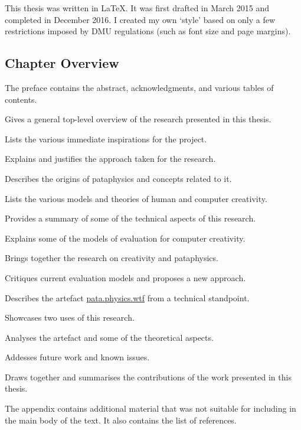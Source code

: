 This thesis was written in \LaTeX. It was first drafted in March 2015 and completed in December 2016. I created my own `style' based on only a few restrictions imposed by \ac{DMU} regulations (such as font size and page margins).


\subsection{Chapter Overview}

The preface contains the abstract, acknowledgments, and various tables of contents.

\begin{description}[leftmargin=3.5cm]
  \item[Introduction] Gives a general top-level overview of the research presented in this thesis.
  \item[Inspirations] Lists the various immediate inspirations for the project.
  \item[Methodology] Explains and justifies the approach taken for the research.
  \item[Pataphysics] Describes the origins of pataphysics and concepts related to it. 
  \item[Creativity] Lists the various models and theories of human and computer creativity.
  \item[Technology] Provides a summary of some of the technical aspects of this research.
  \item[Evaluation] Explains some of the models of evaluation for computer creativity.
  \item[Foundations] Brings together the research on creativity and pataphysics.
  \item[Interpretation] Critiques current evaluation models and proposes a new approach.
  \item[Implementation] Describes the artefact \url{pata.physics.wtf} from a technical standpoint.
  \item[Applications] Showcases two uses of this research.
  \item[Patanalysis] Analyses the artefact and some of the theoretical aspects. 
  \item[Asprirations] Addesses future work and known issues.
  \item[Outroduction] Draws together and summarises the contributions of the work presented in this thesis.
\end{description}

The appendix contains additional material that was not suitable for including in the main body of the text. It also contains the list of references.


\stopcontents[chapters]

